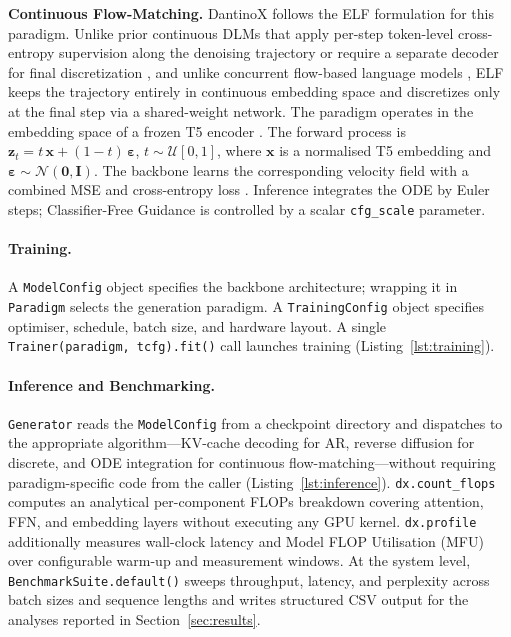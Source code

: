 \noindent\textbf{Continuous Flow-Matching.}
DantinoX follows the ELF formulation \citep{hu-etal-2026-elf} for this
paradigm.
Unlike prior continuous DLMs that apply per-step token-level cross-entropy
supervision along the denoising trajectory
\citep{li-etal-2022-diffusion-lm,nie-etal-2024-llada} or require a separate
decoder for final discretization \citep{lovelace-etal-2023-ld4lg}, and unlike
concurrent flow-based language models
\citep{lee-etal-2026-flm,chen-etal-2026-langflow}, ELF keeps the trajectory
entirely in continuous embedding space and discretizes only at the final step
via a shared-weight network.
The paradigm operates in the embedding space of a frozen T5 encoder
\citep{raffel-etal-2020-t5}.
The forward process is
$\mathbf{z}_t = t\,\mathbf{x} + (1{-}t)\,\boldsymbol\varepsilon$,
$t \sim \mathcal{U}[0,1]$,
where $\mathbf{x}$ is a normalised T5 embedding and
$\boldsymbol\varepsilon \sim \mathcal{N}(\mathbf{0},\mathbf{I})$.
The backbone learns the corresponding velocity field with a combined MSE
and cross-entropy loss \citep{hu-etal-2026-elf}.
Inference integrates the ODE by Euler steps; Classifier-Free Guidance is
controlled by a scalar \texttt{cfg\_scale} parameter.

\paragraph{Training.}
A \texttt{ModelConfig} object specifies the backbone architecture; wrapping it
in \texttt{Paradigm} selects the generation paradigm.
A \texttt{TrainingConfig} object specifies optimiser, schedule, batch size,
and hardware layout.
A single \texttt{Trainer(paradigm, tcfg).fit()} call launches training
(Listing~\ref{lst:training}).

\paragraph{Inference and Benchmarking.}
\texttt{Generator} reads the \texttt{ModelConfig} from a checkpoint directory
and dispatches to the appropriate algorithm—KV-cache decoding for AR,
reverse diffusion for discrete, and ODE integration for continuous flow-matching—without requiring
paradigm-specific code from the caller (Listing~\ref{lst:inference}).
\texttt{dx.count\_flops} computes an analytical per-component FLOPs breakdown
covering attention, FFN, and embedding layers without executing any GPU kernel.
\texttt{dx.profile} additionally measures wall-clock latency and Model FLOP
Utilisation (MFU) over configurable warm-up and measurement windows.
At the system level, \texttt{BenchmarkSuite.default()} sweeps throughput,
latency, and perplexity across batch sizes and sequence lengths and writes
structured CSV output for the analyses reported in Section~\ref{sec:results}.
